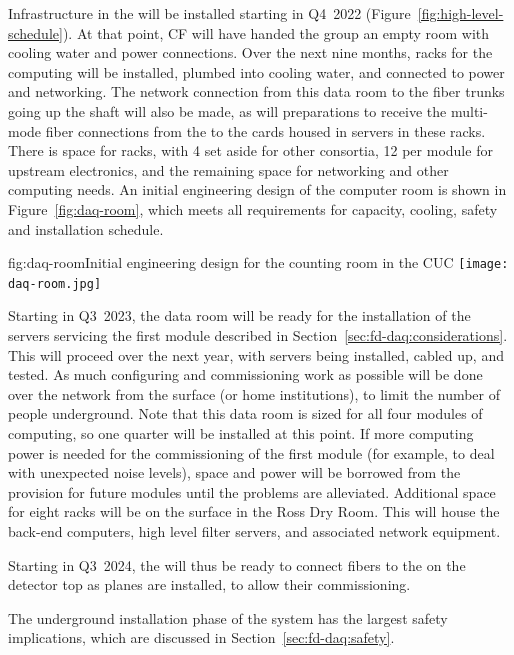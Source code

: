 Infrastructure in the  will be installed starting in Q4~2022
(Figure~\ref{fig:high-level-schedule}).  At that point, CF will have
handed the  group an empty room with cooling water and power
connections.  Over the next nine months, racks for the  computing
will be installed, plumbed into cooling water, and connected to power
and networking.  The network connection from this data room to the fiber
trunks going up the shaft will also be made, as will preparations to
receive the multi-mode fiber connections from the  to the
 cards housed in servers in these racks. There is space
for \cucracks racks, with 4 set aside for other consortia, 12 per
module for upstream  electronics, and the remaining space for
networking and other  computing needs. An initial engineering design of the computer room is shown in Figure~\ref{fig:daq-room}, which meets all requirements for capacity, cooling, safety and installation schedule.

\begin{dunefigure}{fig:daq-room}{Initial engineering design for the  counting room in the CUC}
 \texttt{[image: daq-room.jpg]}
\end{dunefigure}

Starting in Q3~2023, the data room will be ready for the installation of
the  servers servicing the first module described in
Section~\ref{sec:fd-daq:considerations}.  This will proceed over the
next year, with servers being installed, cabled up, and tested.
As much configuring and commissioning work as possible will be done over
the network from the surface (or home institutions), to limit the number
of people underground.  Note that this data room is sized for all four
modules of  computing, so one quarter will be installed at this
point.  If more computing power is needed for the commissioning of the
first module (for example, to deal with unexpected noise levels), space
and power will be borrowed from the provision for future modules until the problems are
alleviated. 
Additional space for eight racks will be on the surface in the Ross Dry
Room. This will house the back-end computers, high level filter servers, and associated network equipment.

Starting in Q3~2024, the  will thus be ready to connect fibers to the
 on the detector top as planes are installed, to allow their commissioning.

The underground installation phase of the  system has the largest safety
implications, which are discussed in Section~\ref{sec:fd-daq:safety}.

